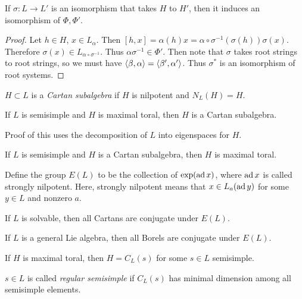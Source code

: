 \documentclass[twoside, 10pt]{article}
\begin{document}
    \begin{prop} If $\sigma:L \to L'$ is an isomorphism that takes $H$ to $H'$,
    then it induces an isomorphism of $\Phi, \Phi'$.  \end{prop}

    \begin{proof} Let $h \in H$, $x \in L_{\alpha}$. Then $[h,x] = \alpha(h)x =
        \alpha \circ \sigma^{-1}(\sigma(h)) \sigma(x)$. Therefore $\sigma(x)
        \in L_{\alpha \circ \sigma^{-1}}$. Thus $\alpha \sigma^{-1} \in \Phi'$.
        Then note that $\sigma$ takes root strings to root strings, so we must
        have $\langle\beta, \alpha\rangle = \langle\beta',\alpha'\rangle$. Thus $\sigma^*$ is
        an isomorphism of root systems.  \end{proof}

    \begin{defn} $H \subset L$ is a \textit{Cartan subalgebra} if $H$ is
    nilpotent and $N_L(H) = H$.  \end{defn}

    \begin{prop} If $L$ is semisimple and $H$ is maximal toral, then $H$ is a
    Cartan subalgebra.  \end{prop}

    Proof of this uses the decomposition of $L$ into eigenspaces for $H$.

    \begin{thm} If $L$ is semisimple and $H$ is a Cartan subalgebra, then $H$
    is maximal toral.  \end{thm}

    Define the group $E(L)$ to be the collection of $\exp(\operatorname{ad} x)$, where $\operatorname{ad}
    x$ is called strongly nilpotent. Here, strongly nilpotent means that $x \in
    L_a(\operatorname{ad} y)$ for some $y \in L$ and nonzero $a$.

    \begin{thm} If $L$ is solvable, then all Cartans are conjugate under
    $E(L)$.  \end{thm}

    \begin{thm} If $L$ is a general Lie algebra, then all Borels are conjugate
    under $E(L)$.  \end{thm}

    \begin{cor} If $H$ is maximal toral, then $H = C_L(s)$ for some $s \in L$
    semisimple.  \end{cor}

    \begin{defn} $s \in L$ is called \textit{regular semisimple} if $C_L(s)$
    has minimal dimension among all semisimple elements.  \end{defn}
\end{document}
